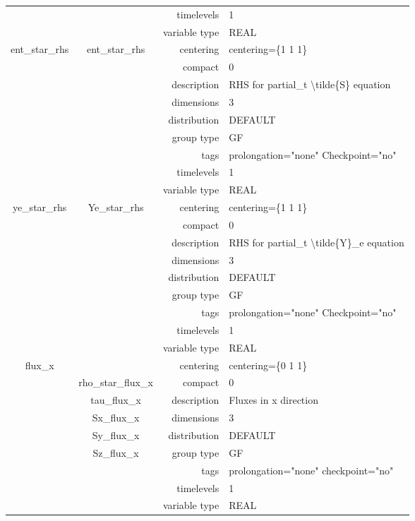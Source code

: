 \begin{tabular*}{150mm}{|c|c@{\extracolsep{\fill}}|rl|}
 &  & timelevels & 1 \\ 
 &  & variable type & REAL \\ 
\hline 
ent\_star\_rhs & ent\_star\_rhs & centering & centering=\{1 1 1\} \\ 
 &  & compact & 0 \\ 
 &  & description & RHS for partial\_t {\textbackslash}tilde\{S\} equation \\ 
 &  & dimensions & 3 \\ 
 &  & distribution & DEFAULT \\ 
 &  & group type & GF \\ 
 &  & tags & prolongation="none" Checkpoint="no" \\ 
 &  & timelevels & 1 \\ 
 &  & variable type & REAL \\ 
\hline 
ye\_star\_rhs & Ye\_star\_rhs & centering & centering=\{1 1 1\} \\ 
 &  & compact & 0 \\ 
 &  & description & RHS for partial\_t {\textbackslash}tilde\{Y\}\_e equation \\ 
 &  & dimensions & 3 \\ 
 &  & distribution & DEFAULT \\ 
 &  & group type & GF \\ 
 &  & tags & prolongation="none" Checkpoint="no" \\ 
 &  & timelevels & 1 \\ 
 &  & variable type & REAL \\ 
\hline 
flux\_x &  & centering & centering=\{0 1 1\} \\ 
 & rho\_star\_flux\_x & compact & 0 \\ 
 & tau\_flux\_x & description & Fluxes in x direction \\ 
 & Sx\_flux\_x & dimensions & 3 \\ 
 & Sy\_flux\_x & distribution & DEFAULT \\ 
 & Sz\_flux\_x & group type & GF \\ 
 &  & tags & prolongation="none" checkpoint="no" \\ 
 &  & timelevels & 1 \\ 
 &  & variable type & REAL \\ 
\hline 
\end{tabular*} 



\vspace{5mm}
\vspace{5mm}

